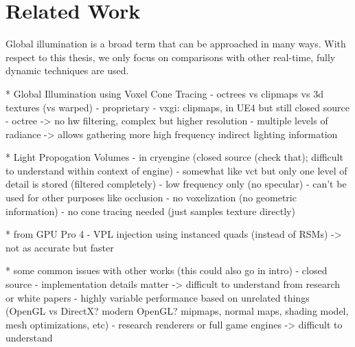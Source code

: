 \chapter{Related Work}

Global illumination is a broad term that can be approached in many ways. With respect to this thesis, we only focus on comparisons with other real-time, fully dynamic techniques are used.

* Global Illumination using Voxel Cone Tracing
    - octrees vs clipmaps vs 3d textures (vs warped)
    - proprietary
    - vxgi: clipmaps, in UE4 but still closed source
    - octree -> no hw filtering, complex but higher resolution
    - multiple levels of radiance -> allows gathering more high frequency indirect lighting information

* Light Propogation Volumes
    - in cryengine (closed source (check that); difficult to understand within context of engine)
    - somewhat like vct but only one level of detail is stored (filtered completely)
        - low frequency only (no specular)
        - can't be used for other purposes like occlusion
    - no voxelization (no geometric information)
    - no cone tracing needed (just samples texture directly)

* from GPU Pro 4
    - VPL injection using instanced quads (instead of RSMs) -> not as accurate but faster

* some common issues with other works (this could also go in intro)
    - closed source
        - implementation details matter -> difficult to understand from research or white papers
        - highly variable performance based on unrelated things (OpenGL vs DirectX? modern OpenGL? mipmaps, normal maps, shading model, mesh optimizations, etc)
    - research renderers or full game engines -> difficult to understand